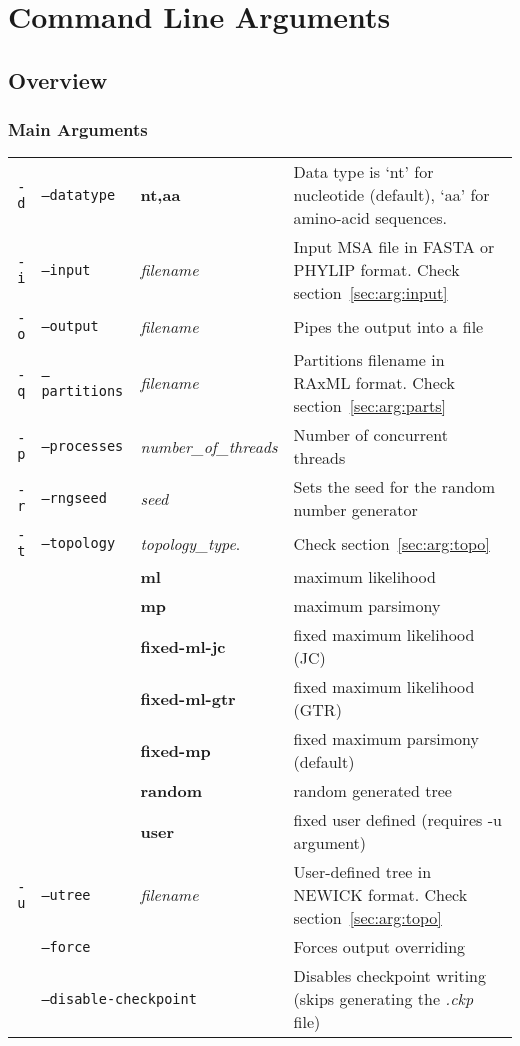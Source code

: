 \section{Command Line Arguments}
\label{sec:arguments}

\subsection{Overview}

\subsubsection{Main Arguments}

\begin{tabular}{rllp{}}
  \hline
  \texttt{-d} & \texttt{--datatype}   & \bf{nt},\bf{aa} & Data type is `nt' for nucleotide (default), `aa' for amino-acid sequences. \\
  \texttt{-i} & \texttt{--input}      & {\em filename} & Input MSA file in FASTA or PHYLIP format. Check section~\ref{sec:arg:input} \\
  \texttt{-o} & \texttt{--output}     & {\em filename} & Pipes the output into a file \\
  \texttt{-q} & \texttt{--partitions} & {\em filename} & Partitions filename in RAxML format. Check section~\ref{sec:arg:parts} \\
  \texttt{-p} & \texttt{--processes}  & {\em number\_of\_threads} & Number of concurrent threads \\
  \texttt{-r} & \texttt{--rngseed}    & {\em seed} & Sets the seed for the random number generator \\
  \texttt{-t} & \texttt{--topology}   & {\em topology\_type}. & Check section~\ref{sec:arg:topo} \\
               && \bf{ml}             & maximum likelihood \\
               && \bf{mp}             & maximum parsimony \\
               && \bf{fixed-ml-jc}    & fixed maximum likelihood (JC) \\
               && \bf{fixed-ml-gtr}   & fixed maximum likelihood (GTR) \\
               && \bf{fixed-mp}       & fixed maximum parsimony (default) \\
               && \bf{random}         & random generated tree \\
               && \bf{user}           & fixed user defined (requires -u argument) \\
  \texttt{-u} & \texttt{--utree}      & {\em filename} & User-defined tree in NEWICK format. Check section~\ref{sec:arg:topo}\\
              & \texttt{--force}      & & Forces output overriding \\
              & \multicolumn{2}{l}{\texttt{--disable-checkpoint}} & Disables checkpoint writing (skips generating the {\em .ckp} file) \\
  \hline
\end{tabular}

